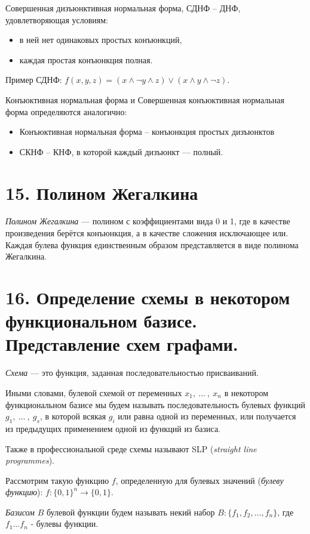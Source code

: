  Совершенная дизъюнктивная нормальная форма, СДНФ -- ДНФ, удовлетворяющая условиям:
 \begin{itemize}
 	\item в ней нет одинаковых простых конъюнкций,
 	\item каждая простая конъюнкция полная.
 \end{itemize}
 
 Пример СДНФ: $f(x,y,z) = (x \land \neg {y} \land z) \lor (x \land y \land \neg {z})$.
 
 Конъюктивная нормальная форма и Совершенная конъюктивная нормальная форма определяются аналогично:
 \begin{itemize}
 	\item Конъюктивная нормальная форма -- конъюнкция простых дизъюнктов
 	\item СКНФ -- КНФ, в которой каждый дизъюнкт --- полный.
 \end{itemize}

\section*{15. Полином Жегалкина}
\textit{Полином Жегалкина} — полином с коэффициентами вида
0 и 1, где в качестве произведения берётся конъюнкция, а в качестве сложения
исключающее или. Каждая булева функция единственным образом представляется в виде полинома Жегалкина.

\section*{16. Определение схемы в некотором функциональном базисе. Представление схем графами.}

\textit{Схема} --- это функция, заданная последовательностью присваиваний.

Иными словами, булевой схемой от переменных $x_1,\ \ldots\ ,\ x_n$ в некотором функциональном базисе мы будем называть последовательность булевых функций $g_1,\ \ldots\ ,\ g_s$, в которой всякая $g_i$ или равна одной из переменных, или
получается из предыдущих применением одной из функций из базиса.

Также в профессиональной среде схемы называют SLP (\textit{straight line programmes}). 

Рассмотрим такую функцию $f$, определенную для булевых значений (\textit{булеву функцию}): $f:\{0, 1\}^n \rightarrow \{0, 1\}$.

\textit{Базисом} $B$ булевой функции будем называть некий набор $B:\{f_1, f_2, \ldots , f_n\}$, где $f_1 \ldots f_n$ - булевы функции.

